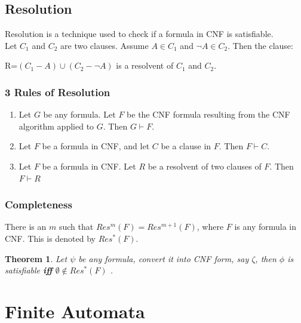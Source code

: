 \documentclass{report}
\newtheorem{theorem}{Theorem}
\begin{document}
\section{Resolution}
Resolution is a technique used to check if a formula in CNF is satisﬁable.\\
Let $C_1$ and $C_2$ are two clauses. Assume $A \in C_1$ and $\neg A \in C_2$. Then the clause:\\
\begin{center}
R=$(C_1-{A}) \cup (C_2-{\neg A})$ is a resolvent of $C_1$ and $C_2$. 
\end{center}
\subsection{3 Rules of Resolution}
\begin{enumerate}
    \item Let $G$ be any formula. Let $F$ be the CNF formula resulting from the CNF algorithm applied to $G$. Then $G \vdash F$.
    \item Let $F$ be a formula in CNF, and let $C$ be a clause in $F$. Then $F \vdash C$.
    \item Let $F$ be a formula in CNF. Let $R$ be a resolvent of two clauses of $F$. Then $F \vdash R$ 
\end{enumerate}
\subsection{Completeness}
There is an $m$ such that $Res^m (F)=Res^{m+1} (F)$, where $F$ is any formula in CNF. This is denoted by $Res^*(F)$.
\begin{theorem}
Let $\psi$ be any formula, convert it into CNF form, say $\zeta$, then $\phi$ is satisfiable \textbf{iff} $\emptyset \notin Res^*(F)$ . 
\end{theorem}

\chapter{Finite Automata}
\end{document}
